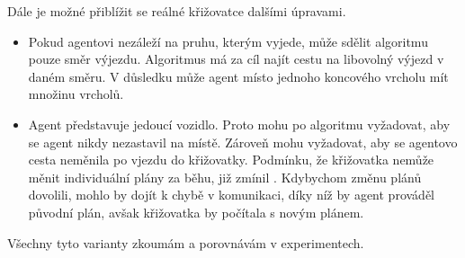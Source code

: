 Dále je možné přiblížit se reálné křižovatce dalšími úpravami.
\begin{itemize}
  \item Pokud agentovi nezáleží na pruhu, kterým vyjede, může sdělit algoritmu pouze směr výjezdu.
  Algoritmus má za cíl najít cestu na libovolný výjezd v daném směru.
  V důsledku může agent místo jednoho koncového vrcholu mít množinu vrcholů.
  \item Agent představuje jedoucí vozidlo.
  Proto mohu po algoritmu vyžadovat, aby se agent nikdy nezastavil na místě.
  Zároveň mohu vyžadovat, aby se agentovo cesta neměnila po vjezdu do křižovatky.
  Podmínku, že křižovatka nemůže měnit individuální plány za běhu, již zmínil \citet{Dresner}.
  Kdybychom změnu plánů dovolili, mohlo by dojít k chybě v komunikaci, díky níž by agent prováděl původní plán,
  avšak křižovatka by počítala s novým plánem.
\end{itemize}

Všechny tyto varianty zkoumám a porovnávám v experimentech.

